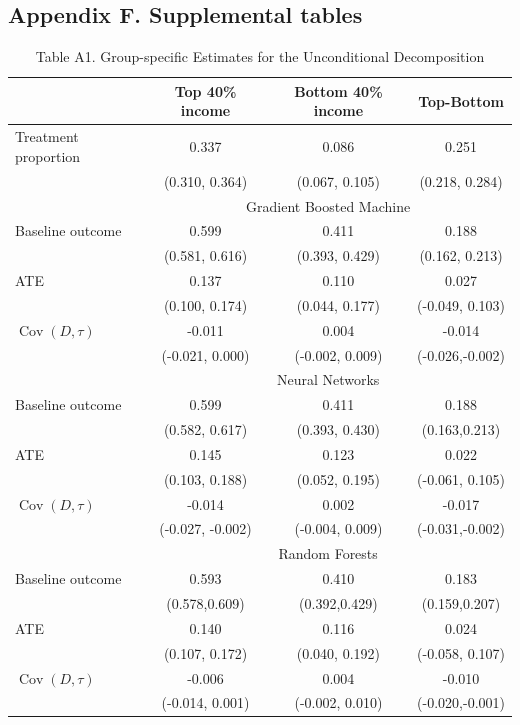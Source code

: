 \documentclass[12pt,a4paper]{article}
\newcommand{\Cov}{\operatorname{Cov}}
\begin{document}
\subsection*{Appendix F. Supplemental tables}
\begin{table}[htbp]
\centering
\caption*{Table A1. Group-specific Estimates for the Unconditional Decomposition} 
\begin{tabular}{lccc}
  \hline
   &  Top 40\% income & Bottom 40\% income  & Top-Bottom \\ 
  \hline
  Treatment proportion & 0.337 & 0.086 & 0.251 \\ 
   & (0.310, 0.364) & (0.067, 0.105) & (0.218, 0.284) \\
  & \multicolumn{3}{c}{Gradient Boosted Machine}  \\
  Baseline outcome & 0.599 & 0.411 & 0.188 \\ 
   & (0.581, 0.616) & (0.393, 0.429) & (0.162, 0.213) \\
  ATE & 0.137 & 0.110 & 0.027 \\ 
  & (0.100, 0.174) & (0.044, 0.177) & (-0.049, 0.103) \\
  $\Cov(D, \tau)$ & -0.011 & 0.004 & -0.014 \\ 
  & (-0.021, 0.000) & (-0.002, 0.009) & (-0.026,-0.002) \\
  & \multicolumn{3}{c}{Neural Networks}  \\
  Baseline outcome & 0.599 & 0.411 & 0.188 \\ 
  & (0.582, 0.617) & (0.393, 0.430) & (0.163,0.213) \\
  ATE & 0.145 & 0.123 & 0.022 \\ 
  & (0.103, 0.188) & (0.052, 0.195) & (-0.061, 0.105) \\
  $\Cov(D, \tau)$ & -0.014 & 0.002 & -0.017 \\ 
  & (-0.027, -0.002) & (-0.004, 0.009) & (-0.031,-0.002) \\
  & \multicolumn{3}{c}{Random Forests}  \\
  Baseline outcome & 0.593 & 0.410 & 0.183 \\ 
  & (0.578,0.609) & (0.392,0.429) & (0.159,0.207) \\
  ATE & 0.140 & 0.116 & 0.024 \\ 
  & (0.107, 0.172) & (0.040, 0.192) & (-0.058, 0.107) \\
  $\Cov(D, \tau)$ & -0.006 & 0.004 & -0.010 \\ 
  & (-0.014, 0.001) & (-0.002, 0.010) & (-0.020,-0.001) \\

\end{tabular}
\end{table}
\end{document}

